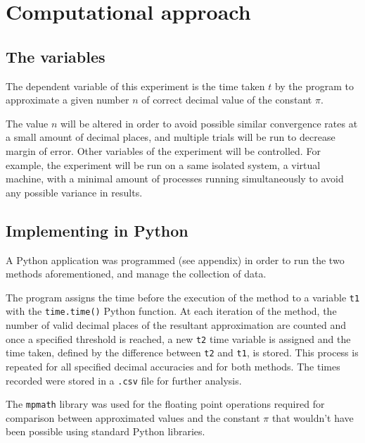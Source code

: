 \section{Computational approach}

\subsection{The variables}
The dependent variable of this experiment is the time taken $t$ by the program
to approximate a given number $n$ of correct decimal value of the constant $\pi$.

The value $n$ will be altered in order to avoid possible similar convergence rates
at a small amount of decimal places, and multiple trials will be run to decrease
margin of error. Other variables of the experiment will be controlled. For example, the experiment
will be run on a same isolated system, a virtual machine, with a minimal amount of
processes running simultaneously to avoid any possible variance in results.


\subsection{Implementing in Python}

A Python application was programmed (see appendix) in order to run the two
methods aforementioned, and manage the collection of data.

The program assigns the time before the execution of the method to a variable \verb|t1|
with the \verb|time.time()| Python function. At each iteration of the method, the number of valid decimal
places of the resultant approximation are counted and once a specified threshold is reached,
a new \verb|t2| time variable is assigned and the time taken, defined by the difference between
\verb|t2| and \verb|t1|, is stored. This process is repeated for all specified decimal accuracies and
for both methods. The times recorded were stored in a \verb|.csv| file for further analysis.

The \verb|mpmath| library was used for the floating point operations required
for comparison between approximated values and the constant $\pi$ that wouldn't
have been possible using standard Python libraries. \cite{mpmath}